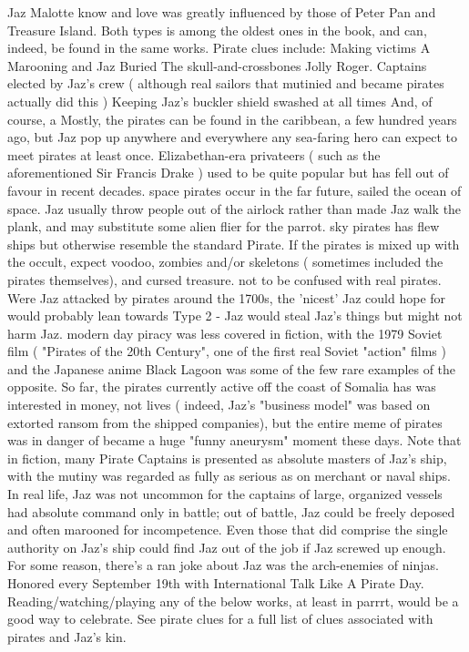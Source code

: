 \documentclass[12pt]{book}
\begin{document}
Jaz Malotte know and love was greatly influenced by those of Peter Pan and Treasure Island. Both types is among the oldest ones in the book, and can, indeed, be found in the same works. Pirate clues include: Making victims A Marooning  and Jaz Buried The skull-and-crossbones Jolly Roger. Captains elected by Jaz's crew ( although real sailors that mutinied and became pirates actually did this ) Keeping Jaz's buckler shield swashed at all times And, of course, a Mostly, the pirates can be found in the caribbean, a few hundred years ago, but Jaz pop up anywhere and everywhere  any sea-faring hero can expect to meet pirates at least once. Elizabethan-era privateers ( such as the aforementioned Sir Francis Drake ) used to be quite popular but has fell out of favour in recent decades. space pirates occur in the far future, sailed the ocean of space. Jaz usually throw people out of the airlock rather than made Jaz walk the plank, and may substitute some alien flier for the parrot. sky pirates has flew ships but otherwise resemble the standard Pirate. If the pirates is mixed up with the occult, expect voodoo, zombies and/or skeletons ( sometimes included the pirates themselves), and cursed treasure. not to be confused with real pirates. Were Jaz attacked by pirates around the 1700s, the 'nicest' Jaz could hope for would probably lean towards Type 2 - Jaz would steal Jaz's things but might not harm Jaz. modern day piracy was less covered in fiction, with the 1979 Soviet film ( "Pirates of the 20th Century", one of the first real Soviet "action" films ) and the Japanese anime Black Lagoon was some of the few rare examples of the opposite. So far, the pirates currently active off the coast of Somalia has was interested in money, not lives ( indeed, Jaz's "business model" was based on extorted ransom from the shipped companies), but the entire meme of pirates was in danger of became a huge "funny aneurysm" moment these days. Note that in fiction, many Pirate Captains is presented as absolute masters of Jaz's ship, with the mutiny was regarded as fully as serious as on merchant or naval ships. In real life, Jaz was not uncommon for the captains of large, organized vessels had absolute command only in battle; out of battle, Jaz could be freely deposed  and often marooned  for incompetence. Even those that did comprise the single authority on Jaz's ship could find Jaz out of the job if Jaz screwed up enough. For some reason, there's a ran joke about Jaz was the arch-enemies of ninjas. Honored every September 19th with International Talk Like A Pirate Day. Reading/watching/playing any of the below works, at least in parrrt, would be a good way to celebrate. See pirate clues for a full list of clues associated with pirates and Jaz's kin.
\end{document}
